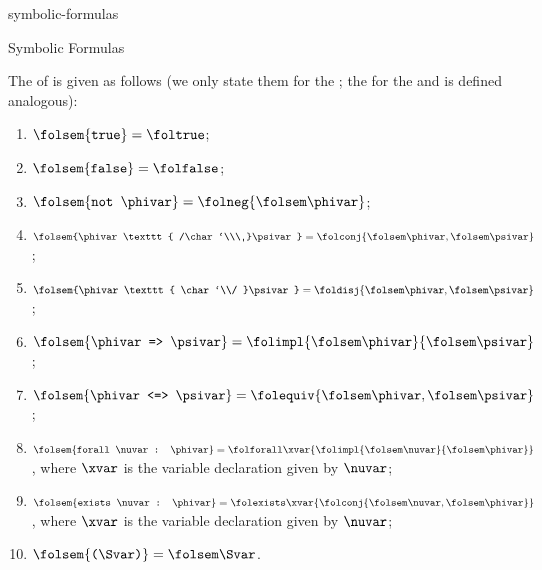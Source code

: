 \documentclass{stex}
\begin{document}
\begin{smodule}{symbolic-formulas}
\begin{sfragment}[id=sec:symbolic-formulas]{Symbolic Formulas}
\begin{sparagraph}[style=symdoc]
    \noindent
    The  of  is given as follows
    (we only state them for the \asciidialect; the 
    for the  and \stexdialect is defined analogous):
    \begin{enumerate}
      \item $\folsem{\texttt{true}}=\foltrue$;
      \item $\folsem{\texttt{false}}=\folfalse$;
      \item $\folsem{\texttt{not }\phivar}=\folneg{\folsem\phivar}$;
      \item $\folsem{\phivar\texttt{ /\char`\\\ }\psivar}=\folconj{\folsem\phivar,\folsem\psivar}$; %
      \item $\folsem{\phivar\texttt{ \char`\\/ }\psivar}=\foldisj{\folsem\phivar,\folsem\psivar}$;
      \item $\folsem{\phivar\texttt{ => }\psivar}=\folimpl{\folsem\phivar}{\folsem\psivar}$;
      \item $\folsem{\phivar\texttt{ <=> }\psivar}=\folequiv{\folsem\phivar,\folsem\psivar}$;
      \item $\folsem{\texttt{forall }\nuvar\texttt{ : }\phivar}=\folforall\xvar{\folimpl{\folsem\nuvar}{\folsem\phivar}}$,
        where $\xvar$ is the variable declaration given by $\nuvar$;
      \item $\folsem{\texttt{exists }\nuvar\texttt{ : }\phivar}=\folexists\xvar{\folconj{\folsem\nuvar,\folsem\phivar}}$,
        where $\xvar$ is the variable declaration given by $\nuvar$;
      \item $\folsem{\texttt(\Svar\texttt)}=\folsem\Svar$.
    \end{enumerate}
  \end{sparagraph}
\end{sfragment}

\ifinputref\else{}\fi

\end{smodule}
\end{document}

